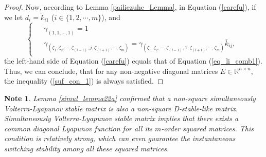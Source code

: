 \documentclass{article}
\newtheorem{note}{Note}
\newtheorem{proof}{Proof}
\begin{document}
\begin{proof}
Now, according to Lemma \ref{pailiezuhe_Lemma}, in Equation (\ref{carefu}), if we let $d_i = \tilde{k}_{i1}$ ($i \in \{1,2,\cdots,m\}$), and
\begin{equation}\label{sub_s}
\begin{cases}
\begin{aligned}
&\gamma_{(1, 1, \cdots, 1)} = 1 \\
&\gamma_{( \zeta_1, \zeta_2, \cdots, \zeta_{(i-1)}, j, \zeta_{(i+1)}, \cdots, \zeta_{m})} = \gamma_{( \zeta_1, \zeta_2, \cdots, \zeta_{(i-1)}, 1, \zeta_{(i+1)}, \cdots, \zeta_{m})} \bar{k}_{ij},
\end{aligned}
\end{cases}
\end{equation}
the left-hand side of Equation (\ref{carefu}) equals that of Equation (\ref{eq_li_comb1}). Thus, we can conclude, that for any non-negative diagonal matrices $E \in  \mathbb{R}^{n \times n}$, the inequality (\ref{suf_con_1}) is always satisfied.
\end{proof}



%




\begin{note}
Lemma \ref{simul_lemma22a} confirmed that a non-square simultaneously Volterra-Lyapunov stable matrix is also a non-square D-stable-like matrix. Simultaneously Volterra-Lyapunov stable matrix implies that there exists a common diagonal Lyapunov function for all its $m$-order squared matrices. This condition is relatively strong, which can even guarantee the instantaneous switching stability among all these squared matrices.    
\end{note}
\end{document}

